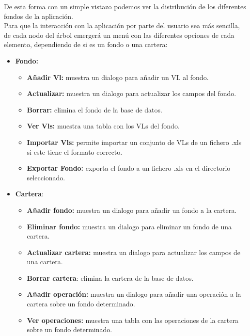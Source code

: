 \documentclass[12pt, a4paper]{article}
\begin{document}
De esta forma con un simple vistazo podemos ver la distribución de los diferentes fondos de la aplicación.
\\

Para que la interacción con la aplicación por parte del usuario sea más sencilla, de cada nodo del árbol emergerá un menú con las diferentes opciones de cada elemento, dependiendo de si es un fondo o una cartera:

\begin{itemize}
	\item \textbf{Fondo:}
	\begin{itemize}
		\item \textbf{Añadir Vl:} muestra un dialogo para añadir un \gls{VL} al fondo.
		\item \textbf{Actualizar:} muestra un dialogo para actualizar los campos del fondo.
		\item \textbf{Borrar:} elimina el fondo de la base de datos.
		\item \textbf{Ver Vls:} muestra una tabla con los \gls{VL}s del fondo.
		\item \textbf{Importar Vls:} permite importar un conjunto de \gls{VL}s de un fichero .xls si este tiene el formato correcto.
		\item \textbf{Exportar Fondo:} exporta el fondo a un fichero .xls en el directorio seleccionado.
	\end{itemize}
\end{itemize}
\newpage
\begin{itemize}
	\item \textbf{Cartera}:
	\begin{itemize}
		\item\textbf{Añadir fondo:} muestra un dialogo para añadir un fondo a la cartera.
		\item \textbf{Eliminar fondo:} muestra un dialogo para eliminar un fondo de una cartera.
		\item \textbf{Actualizar cartera:} muestra un dialogo para actualizar los campos de una cartera.
		\item \textbf{Borrar cartera}: elimina la cartera de la base de datos.
		\item \textbf{Añadir operación:} muestra un dialogo para añadir una operación a la cartera sobre un fondo determinado.
		\item \textbf{Ver operaciones:} muestra una tabla con las operaciones de la cartera sobre un fondo determinado.\\
	\end{itemize}
\end{itemize}
\end{document}
